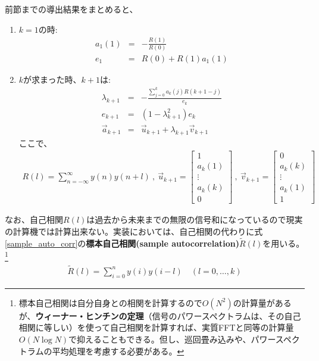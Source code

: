\documentclass[uplatex,dvipdfmx,b5j,10pt]{jsbook}
\theoremstyle{definition}
\begin{document}
前節までの導出結果をまとめると、
\begin{enumerate}
  \item $k=1$の時: 
    \begin{eqnarray}
      a_{1}(1) &=& - \frac{R(1)}{R(0)} \\
      e_{1} &=& R(0) + R(1)a_{1}(1)
    \end{eqnarray}
  \item $k$が求まった時、$k+1$は:
    \begin{eqnarray} \label{levinsonrecursivestep}
      \lambda_{k+1} &=& - \displaystyle\frac{\sum_{j=0}^{k}a_{k}(j)R(k+1-j)}{e_{k}} \\
      e_{k+1} &=&  (1-\lambda_{k+1}^{2})e_{k} \\
      \vec{a}_{k+1} &=& \vec{u}_{k+1} + \lambda_{k+1} \vec{v}_{k+1}
    \end{eqnarray}
    ここで、
    \begin{eqnarray*}
      R(l) = \sum_{n=-\infty}^{\infty} y(n)y(n+l) \ ,\ 
      \vec{u}_{k+1}=
      \begin{bmatrix}
        1 \\ a_{k}(1) \\ \vdots \\ a_{k}(k) \\ 0
      \end{bmatrix} \ ,\ 
      \vec{v}_{k+1}=
      \begin{bmatrix}
        0 \\ a_{k}(k) \\ \vdots \\ a_{k}(1) \\ 1 
      \end{bmatrix}
    \end{eqnarray*}
\end{enumerate}

なお、自己相関$R(l)$は過去から未来までの無限の信号和になっているので現実の計算機では計算出来ない。実装においては、自己相関の代わりに式\ref{sample_auto_corr}の\textbf{標本自己相関(sample autocorrelation)}$\tilde{R}(l)$を用いる。
\footnote{標本自己相関は自分自身との相関を計算するので$O(N^{2})$の計算量があるが、\textbf{ウィーナー・ヒンチンの定理}（信号のパワースペクトラムは、その自己相関に等しい）を使って自己相関を計算すれば、実質FFTと同等の計算量$O(N \log N)$で抑えることもできる。但し、巡回畳み込みや、パワースペクトラムの平均処理を考慮する必要がある。}
\begin{eqnarray}
  \tilde{R}(l) = \sum_{i=0}^{n} y(i)y(i-l) \quad (l = 0, \dots, k) \label{sample_auto_corr}
\end{eqnarray}
\end{document}
